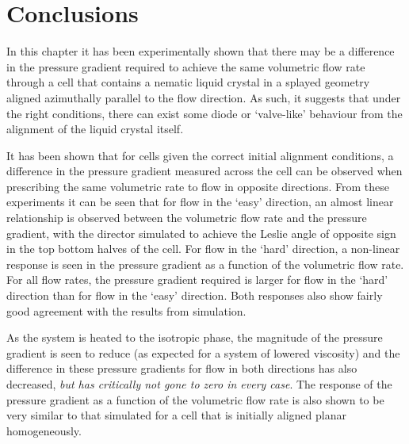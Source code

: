 \section{Conclusions}
In this chapter it has been experimentally shown that there may be a difference in the pressure gradient required to achieve the same volumetric flow rate through a cell that contains a nematic liquid crystal in a splayed geometry aligned azimuthally parallel to the flow direction. As such, it suggests that under the right conditions, there can exist some diode or `valve-like' behaviour from the alignment of the liquid crystal itself.

It has been shown that for cells given the correct initial alignment conditions, a difference in the pressure gradient measured across the cell can be observed when prescribing the same volumetric rate to flow in opposite directions. From these experiments it can be seen that for flow in the `easy' direction, an almost linear relationship is observed between the volumetric flow rate and the pressure gradient, with the director simulated to achieve the Leslie angle of opposite sign in the top bottom halves of the cell. For flow in the `hard' direction, a non-linear response is seen in the pressure gradient as a function of the volumetric flow rate. For all flow rates, the pressure gradient required is larger for flow in the `hard' direction than for flow in the `easy' direction. Both responses also show fairly good agreement with the results from simulation.

As the system is heated to the isotropic phase, the magnitude of the pressure gradient is seen to reduce (as expected for a system of lowered viscosity) and the difference in these pressure gradients for flow in both directions has also decreased, \textit{but has critically not gone to zero in every case}. The response of the pressure gradient as a function of the volumetric flow rate is also shown to be very similar to that simulated for a cell that is initially aligned planar homogeneously.


